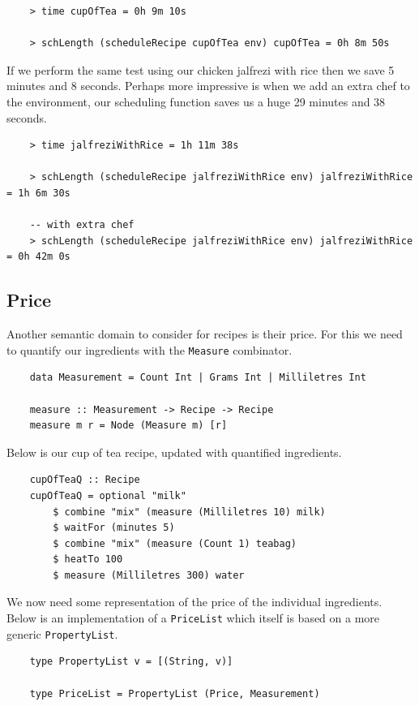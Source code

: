 \documentclass[11pt]{article}
\begin{document}
\begin{lstlisting}
    > time cupOfTea = 0h 9m 10s

    > schLength (scheduleRecipe cupOfTea env) cupOfTea = 0h 8m 50s
\end{lstlisting}

If we perform the same test using our chicken jalfrezi with rice then we save 5 minutes
and 8 seconds. Perhaps more impressive is when we add an extra chef to the environment,
our scheduling function saves us a huge 29 minutes and 38 seconds.

\begin{lstlisting}
    > time jalfreziWithRice = 1h 11m 38s

    > schLength (scheduleRecipe jalfreziWithRice env) jalfreziWithRice = 1h 6m 30s
    
    -- with extra chef
    > schLength (scheduleRecipe jalfreziWithRice env) jalfreziWithRice = 0h 42m 0s
\end{lstlisting}

\subsection{Price}

Another semantic domain to consider for recipes is their price. For this we
need to quantify our ingredients with the \texttt{Measure} combinator.

\begin{lstlisting}
    data Measurement = Count Int | Grams Int | Milliletres Int

    measure :: Measurement -> Recipe -> Recipe
    measure m r = Node (Measure m) [r]
\end{lstlisting}

Below is our cup of tea recipe, updated with quantified ingredients.

\begin{lstlisting}
    cupOfTeaQ :: Recipe
    cupOfTeaQ = optional "milk"
        $ combine "mix" (measure (Milliletres 10) milk)
        $ waitFor (minutes 5)
        $ combine "mix" (measure (Count 1) teabag)
        $ heatTo 100
        $ measure (Milliletres 300) water
\end{lstlisting}

We now need some representation of the price of the individual ingredients.
Below is an implementation of a \texttt{PriceList} which itself is based on
a more generic \texttt{PropertyList}.

\begin{lstlisting}
    type PropertyList v = [(String, v)]

    type PriceList = PropertyList (Price, Measurement)
\end{lstlisting}
\end{document}
